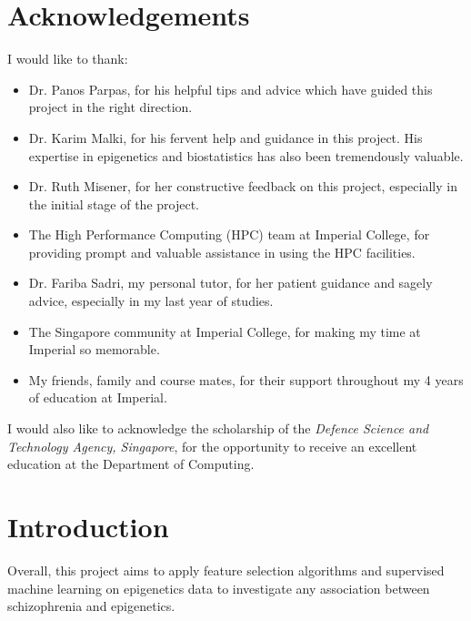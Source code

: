 \documentclass[12pt, twoside, a4paper]{report}
\newcommand\blankpage{%
    \null
    \thispagestyle{empty}%
    \addtocounter{page}{-1}%
    \newpage}
\begin{document}
\afterpage{\blankpage}

\chapter*{Acknowledgements}


I would like to thank:
\begin{itemize}
  \item Dr. Panos Parpas, for his helpful tips and advice which have guided this project in the right direction.
  \item Dr. Karim Malki, for his fervent help and guidance in this project. His expertise in epigenetics and biostatistics has also been tremendously valuable.
  \item Dr. Ruth Misener, for her constructive feedback on this project, especially in the initial stage of the project.
  \item The High Performance Computing (HPC) team at Imperial College, for providing prompt and valuable assistance in using the HPC facilities.
  \item Dr. Fariba Sadri, my personal tutor, for her patient guidance and sagely advice, especially in my last year of studies.
  \item The Singapore community at Imperial College, for making my time at Imperial so memorable.
  \item My friends, family and course mates, for their support throughout my 4 years of education at Imperial.
\end{itemize}

I would also like to acknowledge the scholarship of the \textit{Defence Science and Technology Agency, Singapore}, for the opportunity to receive an excellent education at the Department of Computing.


\afterpage{\blankpage}

\onehalfspacing
\tableofcontents
\singlespacing

\newpage


\chapter{Introduction}


Overall, this project aims to apply feature selection algorithms and supervised machine learning on epigenetics data to investigate any association between schizophrenia and epigenetics.
\end{document}
